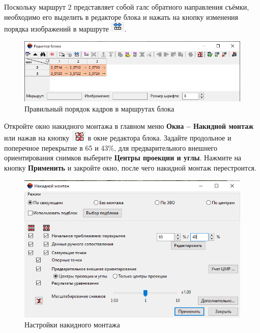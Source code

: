 \documentclass[
  12pt,
]{book}
\begin{document}
Поскольку маршрут 2 представляет собой галс обратного направления съёмки, необходимо его выделить в редакторе блока и нажать на кнопку изменения порядка изображений в маршруте \includegraphics{images/Ref15/Change_Direction.png}.

\begin{figure}
\centering
\includegraphics{images/Ref15/Block_Editor2.png}
\caption{Правильный порядок кадров в маршрутах блока}
\end{figure}

Откройте окно накидного монтажа в главном меню \textbf{Окна -- Накидной монтаж} или нажав на кнопку \includegraphics{images/Ref15/Schematics_Button.png} в окне редактора блока. Задайте продольное и поперечное перекрытие в 65 и 43\%, для предварительного внешнего ориентирования снимков выберите \textbf{Центры проекции и углы}. Нажмите на кнопку \textbf{Применить} и закройте окно, после чего накидной монтаж перестроится.

\begin{figure}
\centering
\includegraphics{images/Ref15/Schematics.png}
\caption{Настройки накидного монтажа}
\end{figure}
\end{document}
